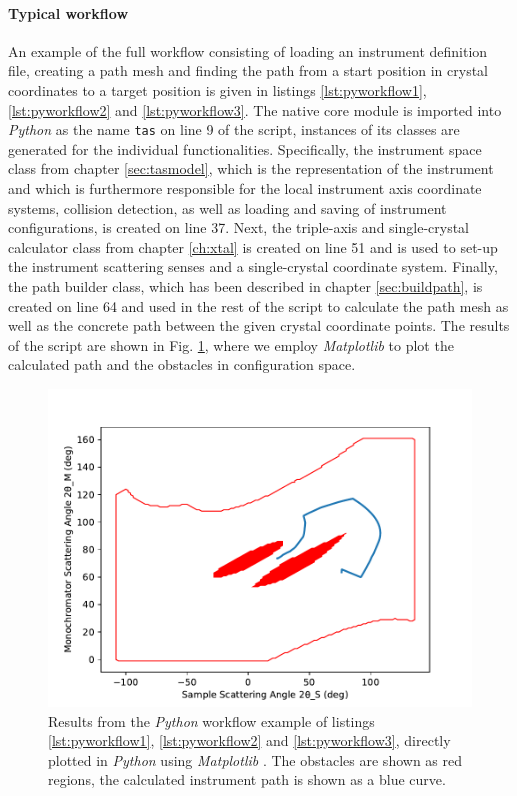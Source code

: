 \paragraph{Typical workflow}
An example of the full workflow consisting of loading an instrument definition file, creating a path 
mesh and finding the path from a start position in crystal coordinates to a target position is given in listings 
\ref{lst:pyworkflow1}, \ref{lst:pyworkflow2} and \ref{lst:pyworkflow3}.
The native core module is imported into \textit{Python} as the name \lstinline[language=C++]|tas| on line 9 of the script,
instances of its classes are generated for the individual functionalities.
Specifically, the instrument space class from chapter \ref{sec:tasmodel}, which is the representation of the instrument 
and which is furthermore responsible for the local instrument axis coordinate systems, collision detection, as well as 
loading and saving of instrument configurations, is created on line 37. 
Next, the triple-axis and single-crystal calculator class from chapter \ref{ch:xtal} is created on line 51 and is 
used to set-up the instrument scattering senses and a single-crystal coordinate system.
Finally, the path builder class, which has been described in chapter \ref{sec:buildpath}, is created on line 64 
and used in the rest of the script to calculate the path mesh as well as the concrete path between the 
given crystal coordinate points.
The results of the script are shown in Fig. \ref{fig:pyworkflow}, where we employ \textit{Matplotlib} 
\cite{Hunter2007, web_matplotlib} to plot the calculated path and the obstacles in configuration space.

\begin{figure}[htb]
		\begin{center}
			\includegraphics[width = 0.66 \textwidth]{figures/pyworkflow}
		\end{center}
	\caption[Python workflow results.]{Results from the \textit{Python} workflow example of listings
		\ref{lst:pyworkflow1}, \ref{lst:pyworkflow2} and \ref{lst:pyworkflow3}, directly plotted 
		in \textit{Python} using \textit{Matplotlib} \cite{Hunter2007, web_matplotlib}.
		The obstacles are shown as red regions, the calculated instrument path is shown as a blue curve.
		\label{fig:pyworkflow}}
\end{figure}


